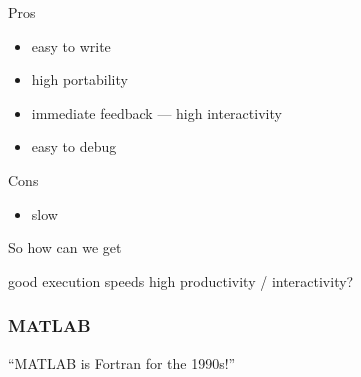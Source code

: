 \begin{frame}

    Pros

    \begin{itemize}
        \item easy to write
        \item high portability
        \item immediate feedback --- high interactivity
        \item easy to debug
    \end{itemize}

    \vspace{0.5em}

    Cons

    \begin{itemize}
        \item slow
    \end{itemize}

\end{frame}


\begin{frame}
    
    So how can we get 

    \begin{center}
    good execution speeds  high productivity / interactivity?
    \end{center}

\end{frame}

\begin{frame}
    \frametitle{MATLAB}

    ``MATLAB is Fortran for the 1990s!''

    \vspace{0.5em}
    \vspace{0.5em}

    \begin{figure}
       \centering
    \end{figure}


\end{frame}



